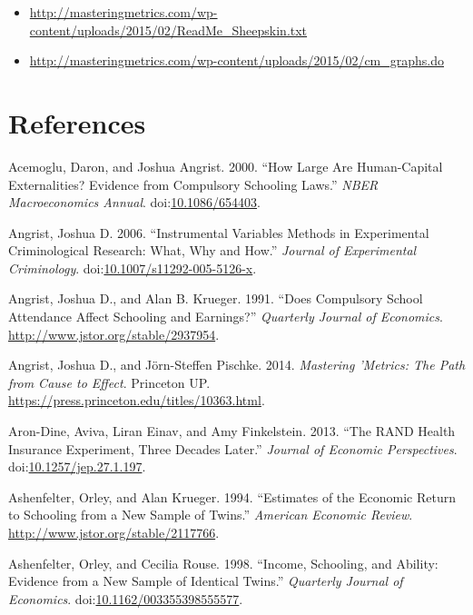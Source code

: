 \documentclass[]{book}
\providecommand{\tightlist}{%
  \setlength{\itemsep}{0pt}\setlength{\parskip}{0pt}}
\theoremstyle{definition}
\theoremstyle{definition}
\theoremstyle{definition}
\theoremstyle{remark}
\begin{document}
\begin{itemize}
\tightlist
\item
  \url{http://masteringmetrics.com/wp-content/uploads/2015/02/ReadMe_Sheepskin.txt}
\item
  \url{http://masteringmetrics.com/wp-content/uploads/2015/02/cm_graphs.do}
\end{itemize}

\chapter*{References}\label{references-10}

\hypertarget{refs}{}
\hypertarget{ref-AcemogluAngrist2000}{}
Acemoglu, Daron, and Joshua Angrist. 2000. ``How Large Are Human-Capital
Externalities? Evidence from Compulsory Schooling Laws.'' \emph{NBER
Macroeconomics Annual}.
doi:\href{https://doi.org/10.1086/654403}{10.1086/654403}.

\hypertarget{ref-Angrist2006}{}
Angrist, Joshua D. 2006. ``Instrumental Variables Methods in
Experimental Criminological Research: What, Why and How.'' \emph{Journal
of Experimental Criminology}.
doi:\href{https://doi.org/10.1007/s11292-005-5126-x}{10.1007/s11292-005-5126-x}.

\hypertarget{ref-AngristKrueger1991}{}
Angrist, Joshua D., and Alan B. Krueger. 1991. ``Does Compulsory School
Attendance Affect Schooling and Earnings?'' \emph{Quarterly Journal of
Economics}. \url{http://www.jstor.org/stable/2937954}.

\hypertarget{ref-AngristPischke2014}{}
Angrist, Joshua D., and Jörn-Steffen Pischke. 2014. \emph{Mastering
'Metrics: The Path from Cause to Effect}. Princeton UP.
\url{https://press.princeton.edu/titles/10363.html}.

\hypertarget{ref-Aron-DineEinavEtAl2013}{}
Aron-Dine, Aviva, Liran Einav, and Amy Finkelstein. 2013. ``The RAND
Health Insurance Experiment, Three Decades Later.'' \emph{Journal of
Economic Perspectives}.
doi:\href{https://doi.org/10.1257/jep.27.1.197}{10.1257/jep.27.1.197}.

\hypertarget{ref-AshenfelterKrueger1994}{}
Ashenfelter, Orley, and Alan Krueger. 1994. ``Estimates of the Economic
Return to Schooling from a New Sample of Twins.'' \emph{American
Economic Review}. \url{http://www.jstor.org/stable/2117766}.

\hypertarget{ref-AshenfelterRouse1998}{}
Ashenfelter, Orley, and Cecilia Rouse. 1998. ``Income, Schooling, and
Ability: Evidence from a New Sample of Identical Twins.''
\emph{Quarterly Journal of Economics}.
doi:\href{https://doi.org/10.1162/003355398555577}{10.1162/003355398555577}.
\end{document}
